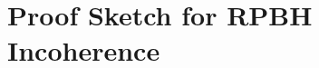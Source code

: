 \clearpage
\setcounter{page}{1}
\maketitlesupplementary
\appendix


\section{Proof Sketch for RPBH Incoherence}
\label{sec:supp-proof-srht}


